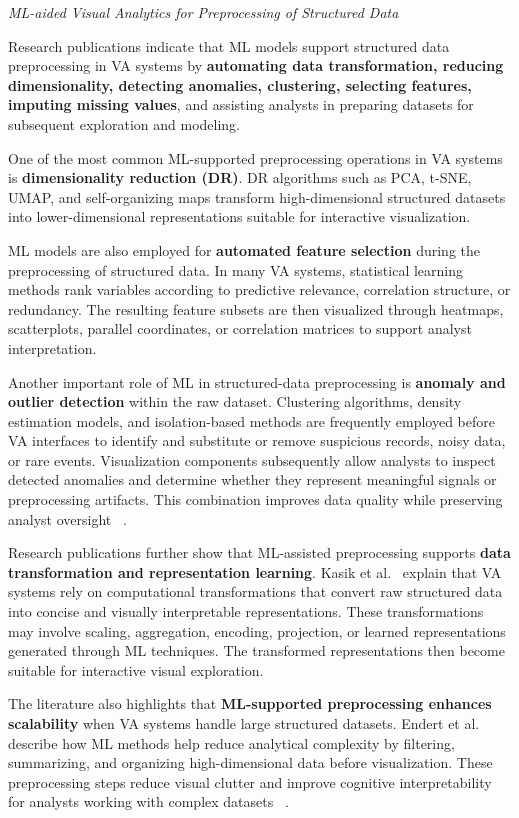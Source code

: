 \documentclass{sfuthesis}
\begin{document}
\noindent\textit{ML-aided Visual Analytics for Preprocessing of Structured Data}\par
Research publications indicate that ML models support structured data preprocessing in VA systems by \textbf{automating data transformation, reducing dimensionality, detecting anomalies, clustering, selecting features, imputing missing values}, and assisting analysts in preparing datasets for subsequent exploration and modeling.\par 
One of the most common ML-supported preprocessing operations in VA systems is \textbf{dimensionality reduction (DR)}. DR algorithms such as PCA, t-SNE, UMAP, and self-organizing maps transform high-dimensional structured datasets into lower-dimensional representations suitable for interactive visualization.\par
ML models are also employed for \textbf{automated feature selection} during the preprocessing of structured data. In many VA systems, statistical learning methods rank variables according to predictive relevance, correlation structure, or redundancy. The resulting feature subsets are then visualized through heatmaps, scatterplots, parallel coordinates, or correlation matrices to support analyst interpretation.\par
Another important role of ML in structured-data preprocessing is \textbf{anomaly and outlier detection} within the raw dataset. Clustering algorithms, density estimation models, and isolation-based methods are frequently employed before VA interfaces to identify and substitute or remove suspicious records, noisy data, or rare events. Visualization components subsequently allow analysts to inspect detected anomalies and determine whether they represent meaningful signals or preprocessing artifacts. This combination improves data quality while preserving analyst oversight ~\cite{endert_state_2017}.\par
Research publications further show that ML-assisted preprocessing supports \textbf{data transformation and representation learning}. Kasik et al.~\cite{kasik_data_2009} explain that VA systems rely on computational transformations that convert raw structured data into concise and visually interpretable representations. These transformations may involve scaling, aggregation, encoding, projection, or learned representations generated through ML techniques. The transformed representations then become suitable for interactive visual exploration.\par
The literature also highlights that \textbf{ML-supported preprocessing enhances scalability} when VA systems handle large structured datasets. Endert et al.~\cite{endert_state_2017} describe how ML methods help reduce analytical complexity by filtering, summarizing, and organizing high-dimensional data before visualization. These preprocessing steps reduce visual clutter and improve cognitive interpretability for analysts working with complex datasets ~\cite{endert_state_2017}.\par
\end{document}
